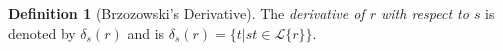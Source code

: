 \documentclass[11pt,leqno]{article}
\theoremstyle{definition}
\newtheorem{defn}[thm]{Definition}
\newcommand{\Lagr}{\mathcal{L}}
\newcommand{\lang}[1]{\Lagr\{#1\}}
\newcommand{\lhead}[1]{ {\sf lhead}(#1) }
\begin{document}











\begin{defn}[Brzozowski's Derivative]\label{def:derivative}
  The \emph{derivative of $r$ with respect to $s$} is denoted by $\delta_s(r)$
  and is $\delta_s(r) = \{t | st \in \lang{r}\}$.
\end{defn}
\end{document}
